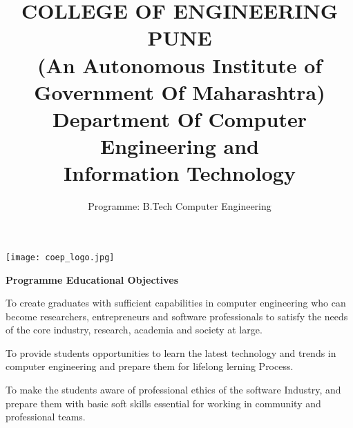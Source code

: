 \documentclass[a4paper]{article}
\begin{document}
\color{black}
\title{
\color{black}
\LARGE {COLLEGE OF ENGINEERING PUNE}\\
\large{(An Autonomous Institute of Government Of Maharashtra)}\\
\LARGE  {Department Of Computer Engineering and}\\
\LARGE  {Information Technology}
}
\author{
\LARGE {Programme: B.Tech Computer Engineering}}
\date{}
\begin{minipage}{.88\textwidth}
\maketitle
\end{minipage}
\begin{minipage}{.09\textwidth}
\hfill{\texttt{[image: coep\_logo.jpg]}}
\end{minipage}
\pagecolor{white!90}

\Large\textbf{Programme Educational Objectives}
\\
\begin{enumerate}

\Large{
\item To create graduates with sufficient capabilities in computer engineering who can become researchers, entrepreneurs and software professionals to satisfy the needs of the core industry, research, academia and society at large.

\item To provide students opportunities to learn the latest technology and trends in computer engineering and prepare them for lifelong lerning Process.

\item To make the students aware of professional ethics of the software Industry, and prepare them with basic soft skills essential for working in community and professional teams.
}
\end{enumerate}
\end{document}
